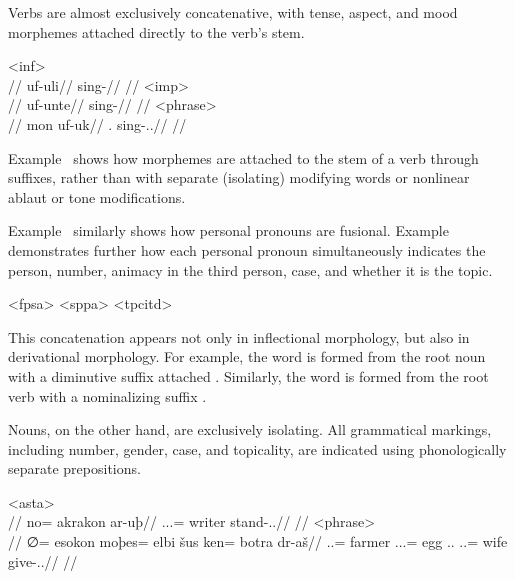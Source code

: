 Verbs are almost exclusively concatenative, with tense, aspect, and mood morphemes attached directly to the verb's stem.

	\a<inf>\begingl
		\glpreamble{}\\
		//
		\gla uf-uli//
		\glb sing-\Inf//
		\glft {}//
	\endgl
	\a<imp>\begingl
		\glpreamble{}\\
		//
		\gla uf-unte//
		\glb sing-\Imp//
		\glft {}//
	\endgl
	\a<phrase>\begingl
		\glpreamble{}\\
		//
		\gla mon uf-uk//
		\glb \Fps.\Top{} sing-\Ind.\Pst.\Prf//
	\glft {}//
	\endgl
\xe

Example~ shows how morphemes are attached to the stem of a verb through suffixes, rather than with separate (isolating) modifying words or nonlinear ablaut or tone modifications.

Example~ similarly shows how personal pronouns are fusional. Example~ demonstrates further how each personal pronoun simultaneously indicates the person, number, animacy in the third person, case, and whether it is the topic.

	\a<fpsa>    
	\a<sppa>    
	\a<tpcitd>    
\xe

This concatenation appears not only in inflectional morphology, but also in derivational morphology. For example, the word    is formed from the root noun    with a diminutive suffix attached . Similarly, the word    is formed from the root verb    with a nominalizing suffix .

Nouns, on the other hand, are exclusively isolating. All grammatical markings, including number, gender, case, and topicality, are indicated using phonologically separate prepositions.

	\a<asta>\begingl
		\glpreamble{}\\
		//
		\gla no= akrakon ar-uþ//
		\glb \An.\Sg.\Top.\Abs= writer stand-\Ind.\Npst.\Prg//
		\glft {}//
	\endgl
	\a<phrase>\begingl
		\glpreamble{}\\
		//
		\gla ∅= esokon moþes= elbi šus ken= botra dr-aš//
		\glb \An.\Sg.\Abs= farmer \In.\Pc.\Top.\Acc= egg \Tps.\An.\Gen{} \An.\Pl.\Dat= wife give-\Ind.\Npst.\Rtsp//
		\glft {}//
	\endgl
\xe

